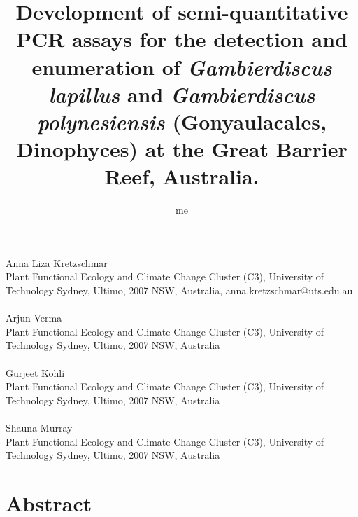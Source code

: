 \documentclass[12pt]{article}
\title{Development of semi-quantitative PCR assays for the detection and enumeration of \emph{Gambierdiscus lapillus} and \emph{Gambierdiscus polynesiensis} (Gonyaulacales, Dinophyces) at the Great Barrier Reef, Australia.}
\author{me}
\date{}
\begin{document}
\maketitle
\paragraph{}Anna Liza Kretzschmar\\
Plant Functional Ecology and Climate Change Cluster (C3), University of Technology Sydney, Ultimo, 2007 NSW, Australia, anna.kretzschmar@uts.edu.au
\paragraph{}Arjun Verma \\
Plant Functional Ecology and Climate Change Cluster (C3), University of Technology Sydney, Ultimo, 2007 NSW, Australia
\paragraph{}Gurjeet Kohli\\ 
Plant Functional Ecology and Climate Change Cluster (C3), University of Technology Sydney, Ultimo, 2007 NSW, Australia
\paragraph{}Shauna Murray\\ 
Plant Functional Ecology and Climate Change Cluster (C3), University of Technology Sydney, Ultimo, 2007 NSW, Australia
\newpage
\section{Abstract}

\newpage
\end{document}
